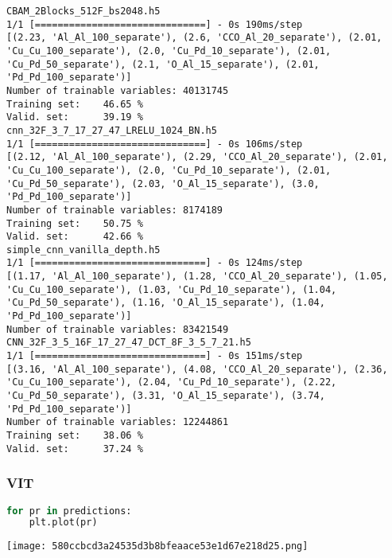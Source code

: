 \begin{lstlisting}
CBAM_2Blocks_512F_bs2048.h5
1/1 [==============================] - 0s 190ms/step
[(2.23, 'Al_Al_100_separate'), (2.6, 'CCO_Al_20_separate'), (2.01, 'Cu_Cu_100_separate'), (2.0, 'Cu_Pd_10_separate'), (2.01, 'Cu_Pd_50_separate'), (2.1, 'O_Al_15_separate'), (2.01, 'Pd_Pd_100_separate')]
Number of trainable variables: 40131745
Training set: 	 46.65 %
Valid. set: 	 39.19 %
cnn_32F_3_7_17_27_47_LRELU_1024_BN.h5
1/1 [==============================] - 0s 106ms/step
[(2.12, 'Al_Al_100_separate'), (2.29, 'CCO_Al_20_separate'), (2.01, 'Cu_Cu_100_separate'), (2.0, 'Cu_Pd_10_separate'), (2.01, 'Cu_Pd_50_separate'), (2.03, 'O_Al_15_separate'), (3.0, 'Pd_Pd_100_separate')]
Number of trainable variables: 8174189
Training set: 	 50.75 %
Valid. set: 	 42.66 %
simple_cnn_vanilla_depth.h5
1/1 [==============================] - 0s 124ms/step
[(1.17, 'Al_Al_100_separate'), (1.28, 'CCO_Al_20_separate'), (1.05, 'Cu_Cu_100_separate'), (1.03, 'Cu_Pd_10_separate'), (1.04, 'Cu_Pd_50_separate'), (1.16, 'O_Al_15_separate'), (1.04, 'Pd_Pd_100_separate')]
Number of trainable variables: 83421549
CNN_32F_3_5_16F_17_27_47_DCT_8F_3_5_7_21.h5
1/1 [==============================] - 0s 151ms/step
[(3.16, 'Al_Al_100_separate'), (4.08, 'CCO_Al_20_separate'), (2.36, 'Cu_Cu_100_separate'), (2.04, 'Cu_Pd_10_separate'), (2.22, 'Cu_Pd_50_separate'), (3.31, 'O_Al_15_separate'), (3.74, 'Pd_Pd_100_separate')]
Number of trainable variables: 12244861
Training set: 	 38.06 %
Valid. set: 	 37.24 %
\end{lstlisting}

\hypertarget{vit}{%
\subsubsection{VIT}\label{vit}}

\begin{lstlisting}[language=Python]
for pr in predictions:
    plt.plot(pr)
\end{lstlisting}

\texttt{[image: 580ccbcd3a24535d3b8bfeaace53e1d67e218d25.png]}

